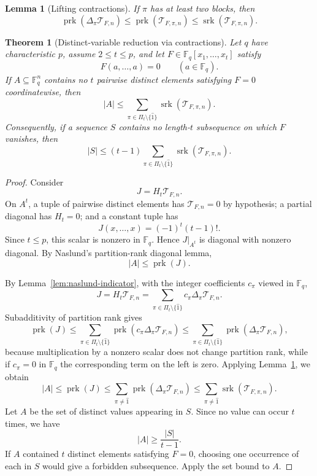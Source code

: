 \documentclass[10pt,a4paper]{amsart}
\newtheorem{lemma}{Lemma}
\newtheorem{theorem}{Theorem}
\newcommand{\F}{\mathbb F}
\newcommand{\Tau}{\mathcal T}
\newcommand{\prk}{\operatorname{prk}}
\newcommand{\srk}{\operatorname{srk}}
\begin{document}
\begin{lemma}[Lifting contractions]\label{lem:lifting}
If $\pi$ has at least two blocks, then
\[
 \prk(\Delta_\pi\Tau_{F,n})
 \le\prk(\Tau_{F,\pi,n})
 \le\srk(\Tau_{F,\pi,n}).
\]
\end{lemma}

\begin{theorem}[Distinct-variable reduction via contractions]\label{thm:distinct-reduction}
Let $q$ have characteristic $p$, assume $2\le t\le p$, and let $F\in\F_q[x_1,\ldots,x_t]$ satisfy
\[
 F(a,\ldots,a)=0\qquad(a\in\F_q).
\]
If $A\subseteq\F_q^n$ contains no $t$ pairwise distinct elements satisfying $F=0$ coordinatewise, then
\[
 |A|
 \le
 \sum_{\pi\in\Pi_t\setminus\{\widehat1\}}
 \srk(\Tau_{F,\pi,n}).
\]
Consequently, if a sequence $S$ contains no length-$t$ subsequence on which $F$ vanishes, then
\[
 |S|
 \le
 (t-1)
 \sum_{\pi\in\Pi_t\setminus\{\widehat1\}}
 \srk(\Tau_{F,\pi,n}).
\]
\end{theorem}

\begin{proof}
Consider
\[
 J=H_t\Tau_{F,n}.
\]
On $A^t$, a tuple of pairwise distinct elements has
$\Tau_{F,n}=0$ by hypothesis; a partial diagonal has $H_t=0$;
and a constant tuple has
\[
 J(x,\ldots,x)=(-1)^t(t-1)!.
\]
Since $t\le p$, this scalar is nonzero in $\F_q$. Hence
$J|_{A^t}$ is diagonal with nonzero diagonal. By Naslund's
partition-rank diagonal lemma,
\[
 |A|\le\prk(J).
\]

By Lemma~\ref{lem:naslund-indicator}, with the integer coefficients
$c_\pi$ viewed in $\F_q$,
\[
 J
 =H_t\Tau_{F,n}
 =\sum_{\pi\in\Pi_t\setminus\{\widehat1\}}
 c_\pi\Delta_\pi\Tau_{F,n}.
\]
{Subadditivity of partition rank gives
\[
 \prk(J)
 \le
 \sum_{\pi\in\Pi_t\setminus\{\widehat1\}}
 \prk(c_\pi\Delta_\pi\Tau_{F,n})
 \le
 \sum_{\pi\in\Pi_t\setminus\{\widehat1\}}
 \prk(\Delta_\pi\Tau_{F,n}),
\]
because multiplication by a nonzero scalar does not change partition
rank, while if $c_\pi=0$ in $\F_q$ the corresponding term on the
left is zero. Applying Lemma~\ref{lem:lifting}, we obtain
\[
 |A|
 \le\prk(J)
 \le\sum_{\pi\ne\widehat1}\prk(\Delta_\pi\Tau_{F,n})
 \le\sum_{\pi\ne\widehat1}\srk(\Tau_{F,\pi,n}).
\]
Let \(A\) be the set of distinct values appearing in \(S\).
Since no value can occur \(t\) times, we have
\[
 |A|\ge \frac{|S|}{t-1}.
\]
If \(A\) contained \(t\) distinct elements satisfying \(F=0\),
choosing one occurrence of each in \(S\) would give a forbidden
subsequence. Apply the set bound to \(A\).}
\end{proof}
\end{document}
